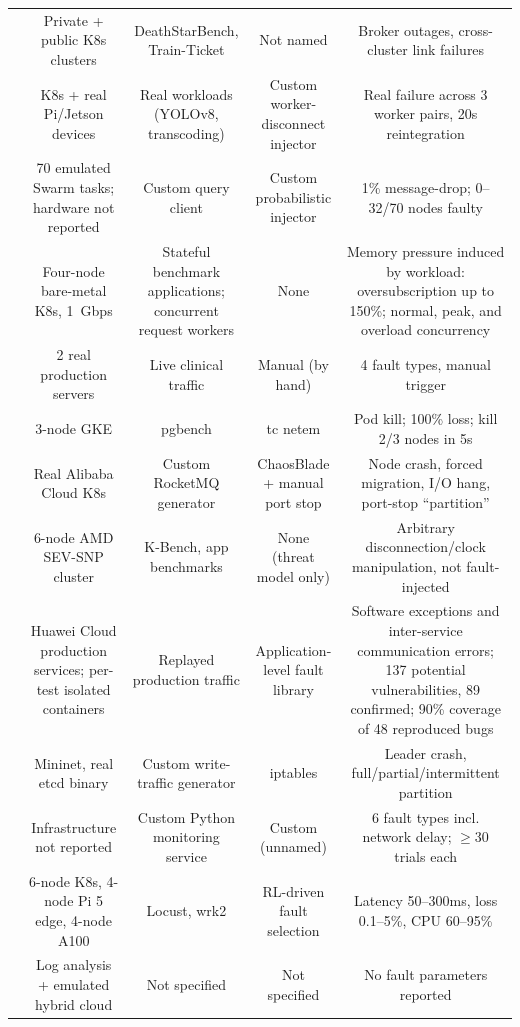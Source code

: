 \documentclass[10pt]{article}
\begin{document}
\begin{table}[t]
{\begin{tabular}{@{}lcccc@{}}
\cite{bongu2026middleware} & Private + public K8s clusters & DeathStarBench, Train-Ticket & Not named & Broker outages, cross-cluster link failures \\
\cite{kwon2026erpf} & K8s + real Pi/Jetson devices & Real workloads (YOLOv8, transcoding) & Custom worker-disconnect injector & Real failure across 3 worker pairs, 20s reintegration \\
\cite{javens2026adaptive} & 70 emulated Swarm tasks; hardware not reported & Custom query client & Custom probabilistic injector & 1\% message-drop; 0--32/70 nodes faulty \\
\cite{kang2026evmm} & Four-node bare-metal K8s, 1~Gbps & Stateful benchmark applications; concurrent request workers & None & Memory pressure induced by workload: oversubscription up to 150\%; normal, peak, and overload concurrency \\
\cite{naim2026doublecheck} & 2 real production servers & Live clinical traffic & Manual (by hand) & 4 fault types, manual trigger \\
\cite{jerrari2026ha} & 3-node GKE & pgbench & tc netem & Pod kill; 100\% loss; kill 2/3 nodes in 5s \\
\cite{jin2026replicationfree} & Real Alibaba Cloud K8s & Custom RocketMQ generator & ChaosBlade + manual port stop & Node crash, forced migration, I/O hang, port-stop ``partition'' \\
\cite{li2026pyramid} & 6-node AMD SEV-SNP cluster & K-Bench, app benchmarks & None (threat model only) & Arbitrary disconnection/clock manipulation, not fault-injected \\
\cite{chen2026cast} & Huawei Cloud production services; per-test isolated containers & Replayed production traffic & Application-level fault library & Software exceptions and inter-service communication errors; 137 potential vulnerabilities, 89 confirmed; 90\% coverage of 48 reproduced bugs \\
\cite{jensen2021raft} & Mininet, real etcd binary & Custom write-traffic generator & iptables & Leader crash, full/partial/intermittent partition \\
\midrule
\cite{dsouza2026selfhealing} & Infrastructure not reported & Custom Python monitoring service & Custom (unnamed) & 6 fault types incl. network delay; $\geq$30 trials each \\
\cite{nigam2026chaos} & 6-node K8s, 4-node Pi 5 edge, 4-node A100 & Locust, wrk2 & RL-driven fault selection & Latency 50--300ms, loss 0.1--5\%, CPU 60--95\% \\
\cite{mishra2026aidriven} & Log analysis + emulated hybrid cloud & Not specified & Not specified & No fault parameters reported \\
\bottomrule
\end{tabular}}
\end{table}
\end{document}

